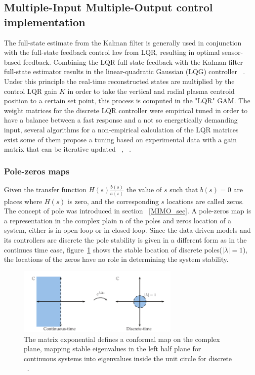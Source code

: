\subsection{Multiple-Input Multiple-Output control implementation}



The full-state estimate from the Kalman filter is generally used in conjunction with the
full-state feedback control law from LQR, resulting in optimal sensor-based feedback. Combining the LQR full-state feedback with the Kalman filter full-state estimator results in the linear-quadratic Gaussian (LQG) controller ~\cite[Chapter~8]{DataDriven2019}. Under this principle the real-time reconstructed states are multiplied by the control LQR gain $K$ in order to take the  vertical and radial plasma centroid position to a certain set point, this process is computed in the "LQR" GAM. The weight matrices for the discrete LQR controller were empirical tuned in order to have a balance between a fast response and a not so energetically demanding input, several algorithms for a non-empirical calculation of the LQR matrices exist some of them propose a tuning based on experimental data with a gain matrix that can be iterative updated ~\cite[Chapter~9]{Franklin1998}, ~\cite{Trimpe2014}.
\smallskip



\subsubsection{Pole-zeros maps}



Given the transfer function $H(s)\frac{b(s)}{a(s)}$ the value of $s$ such that $b(s)=0$ are places where $H(s)$ is zero, and the corresponding $s$ locations are called zeros. The  concept of pole  was introduced in section ~\ref{MIMO_sec}.  A pole-zeros map is a representation in the complex plain n of the poles and zeros location of a system, either is in open-loop or in closed-loop. Since the data-driven models and its controllers are discrete the pole stability is given in a different form as in the continues time case,  figure~\ref{PoleZeroMap} shows the stable location of discrete poles($|\lambda|=1$),  the locations of the zeros have no role in determining the system stability.\smallskip



\begin{figure}[h]
	\centering
	\includegraphics[width=0.7\textwidth]{Chp5/PolesZerosMaps.png}
	
	\caption{ The matrix exponential defines a conformal map on the complex plane, mapping stable eigenvalues in the left half plane for continuous systems into eigenvalues inside the unit circle for discrete ~\cite[Chapter~8]{DataDriven2019}\label{PoleZeroMap}.}
\end{figure}

